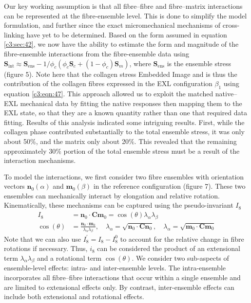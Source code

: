     Our key working assumption is that all fibre–fibre and fibre–matrix interactions can be represented at the fibre-ensemble level. This is done to simplify the model formulation, and further since the exact micromechanical mechanisms of cross-linking have yet to be determined. Based on the form assumed in equation \ref{c3:sec:42}, we now have the ability to estimate the form and magnitude of the fibre-ensemble interactions from the fibre-ensemble data using $\mathbf{S}_\mathrm{int} \approx \mathbf{S}_\mathrm{ens} - 1/\phi_c(\phi_c \mathbf{S}_c + (1 - \phi_c)\mathbf{S}_m)$, where $\mathbf{S}_\mathrm{ens}$ is the ensemble stress (figure 5). Note here that the collagen stress Embedded Image and is thus the contribution of the collagen fibres expressed in the EXL configuration $\beta_1$ using equation \ref{c3:eqn:47}. This approach allowed us to exploit the matched native–EXL mechanical data by fitting the native responses then mapping them to the EXL state, so that they are a known quantity rather than one that required data fitting. Results of this analysis indicated some intriguing results. First, while the collagen phase contributed substantially to the total ensemble stress, it was only about 50\%, and the matrix only about 20\%. This revealed that the remaining approximately 30\% portion of the total ensemble stress must be a result of the interaction mechanisms.
    
    
    To model the interactions, we first consider two fibre ensembles with orientation vectors $\mathbf{n}_0(\alpha)$ and $\mathbf{m}_0(\beta)$ in the reference configuration (figure 7). These two ensembles can mechanically interact by elongation and relative rotation. Kinematically, these mechanisms can be captured using the pseudo-invariant $I_8$ \cite{holzapfel_nonlinear_2000}\cite{merodio_influence_2006} 
        \begin{equation}\label{c3:eqn:49}
        \begin{aligned}
        I_8 &= \mathbf{n}_0\cdot\mathbf{C}\mathbf{m}_0 = \cos(\theta)\lambda_\alpha\lambda_\beta \\
        \cos(\theta) &= \frac{\mathbf{n}_0\cdot\mathbf{m}_0}{\lambda_\alpha\lambda_\beta}, \quad \lambda_\alpha=\sqrt{\mathbf{n}_0\cdot\mathbf{C}\mathbf{n}_0}, \quad \lambda_\alpha=\sqrt{\mathbf{m}_0\cdot\mathbf{C}\mathbf{m}_0} 
        \end{aligned}
        \end{equation}
    Note that we can also use $I_8^\prime = I_8  - I_8^0$ \cite{merodio_influence_2006} to account for the relative change in fibre rotations if necessary. Thus, $i_8$ can be considered the product of an extensional term $\lambda_\alpha \lambda_\beta$ and a rotational term $\cos(\theta)$. We consider two sub-aspects of ensemble-level effects: intra- and inter-ensemble levels. The intra-ensemble incorporates all fibre–fibre interactions that occur within a single ensemble and are limited to extensional effects only. By contrast, inter-ensemble effects can include both extensional and rotational effects.
    
